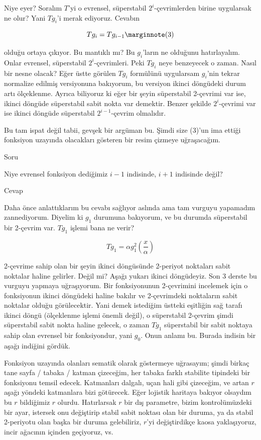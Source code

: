 \documentclass[12pt,fleqn]{article}\usepackage{../../common}
\begin{document}
Niye eyer? Soralım $T$'yi o evrensel, süperstabil $2^i$-çevrimlerden birine
uygularsak ne olur? Yani $T g_i$'i merak ediyoruz. Cevabın

$$Tg_i = Tg_{i-1} 
\mlabel{3}$$

olduğu ortaya çıkıyor. Bu mantıklı mı? Bu $g_i$'ların ne olduğunu
hatırlayalım. Onlar evrensel, süperstabil $2^i$-çevrimleri. Peki $T g_i$ neye
benzeyecek o zaman. Nasıl bir nesne olacak? Eğer üstte görülen $Tg_i$ formülünü
uygularsam $g_i$'nin tekrar normalize edilmiş versiyonuna bakıyorum, bu versiyon
ikinci döngüdeki durum artı ölçeklenme. Ayrıca biliyoruz ki eğer bir şeyin
süperstabil 2-çevrimi var ise, ikinci döngüde süperstabil sabit nokta var
demektir. Benzer şekilde $2^i$-çevrimi var ise ikinci döngüde süperstabil
$2^{i-1}$-çevrim olmalıdır.

Bu tam ispat değil tabii, gevşek bir argüman bu. Şimdi size (3)'un ima ettiği
fonksiyon uzayında olacakları gösteren bir resim çizmeye uğraşacağım.

Soru

Niye evrensel fonksiyon dediğimiz $i-1$ indisinde, $i+1$ indisinde değil?

Cevap

Daha önce anlattıklarım bu cevabı sağlıyor aslında ama tam vurguyu yapamadım
zannediyorum. Diyelim ki $g_1$ durumuna bakıyorum, ve bu durumda süperstabil bir
2-çevrim var. $T g_1$ işlemi bana ne verir?

$$ T g_1 = \alpha g_1^2 \left( \frac{x}{\alpha} \right) $$

2-çevrime sahip olan bir şeyin ikinci döngüsünde 2-periyot noktaları sabit
noktalar haline gelirler. Değil mi? Aşağı yukarı ikinci döngüdeyiz. Son 3
derste bu vurguyu yapmaya uğraşıyorum. Bir fonksiyonunun 2-çevrimini
incelemek için o fonksiyonun ikinci döngüdeki haline bakılır ve
2-çevrimdeki noktaların sabit noktalar olduğu görülecektir. Yani demek
istediğim üstteki eşitliğin sağ tarafı ikinci döngü (ölçeklenme işlemi
önemli değil), o süperstabil 2-çevrim şimdi süperstabil sabit nokta haline
gelecek, o zaman $T g_1$ süperstabil bir sabit noktaya sahip olan evrensel
bir fonksiyondur, yani $g_0$. Onun anlamı bu. Burada indisin bir aşağı
indiğini gördük.

Fonksiyon uzayında olanları sematik olarak göstermeye uğrasayım; şimdi
birkaç tane sayfa / tabaka / katman çizeceğim, her tabaka farklı stabilite
tipindeki bir fonksiyonu temsil edecek. Katmanları dalgalı, uçan hali gibi
çizeceğim, ve artan $r$ aşağı yöndeki katmanlara bizi götürecek. Eğer
lojistik haritaya bakıyor olsaydım bu $r$ bildiğimiz $r$
olurdu. Hatırlarsak $r$ bir dış parametre, bizim kontrolümüzdeki bir ayar,
istersek onu değiştirip stabil sabit noktası olan bir duruma, ya da stabil
2-periyotu olan başka bir duruma gelebiliriz, $r$'yi değiştirdikçe kaosa
yaklaşıyoruz, incir ağacının içinden geçiyoruz, vs.
\end{document}
